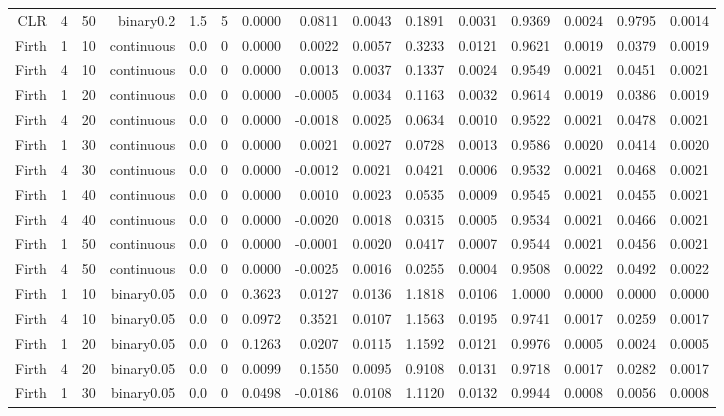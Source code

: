 \begin{longtable}{rrrrrrrrrrrrrrr}
  CLR & 4 & 50 & binary0.2 & 1.5 & 5 & 0.0000 & 0.0811 & 0.0043 & 0.1891 & 0.0031 & 0.9369 & 0.0024 & 0.9795 & 0.0014 \\ 
  Firth & 1 & 10 & continuous & 0.0 & 0 & 0.0000 & 0.0022 & 0.0057 & 0.3233 & 0.0121 & 0.9621 & 0.0019 & 0.0379 & 0.0019 \\ 
  Firth & 4 & 10 & continuous & 0.0 & 0 & 0.0000 & 0.0013 & 0.0037 & 0.1337 & 0.0024 & 0.9549 & 0.0021 & 0.0451 & 0.0021 \\ 
  Firth & 1 & 20 & continuous & 0.0 & 0 & 0.0000 & -0.0005 & 0.0034 & 0.1163 & 0.0032 & 0.9614 & 0.0019 & 0.0386 & 0.0019 \\ 
  Firth & 4 & 20 & continuous & 0.0 & 0 & 0.0000 & -0.0018 & 0.0025 & 0.0634 & 0.0010 & 0.9522 & 0.0021 & 0.0478 & 0.0021 \\ 
  Firth & 1 & 30 & continuous & 0.0 & 0 & 0.0000 & 0.0021 & 0.0027 & 0.0728 & 0.0013 & 0.9586 & 0.0020 & 0.0414 & 0.0020 \\ 
  Firth & 4 & 30 & continuous & 0.0 & 0 & 0.0000 & -0.0012 & 0.0021 & 0.0421 & 0.0006 & 0.9532 & 0.0021 & 0.0468 & 0.0021 \\ 
  Firth & 1 & 40 & continuous & 0.0 & 0 & 0.0000 & 0.0010 & 0.0023 & 0.0535 & 0.0009 & 0.9545 & 0.0021 & 0.0455 & 0.0021 \\ 
  Firth & 4 & 40 & continuous & 0.0 & 0 & 0.0000 & -0.0020 & 0.0018 & 0.0315 & 0.0005 & 0.9534 & 0.0021 & 0.0466 & 0.0021 \\ 
  Firth & 1 & 50 & continuous & 0.0 & 0 & 0.0000 & -0.0001 & 0.0020 & 0.0417 & 0.0007 & 0.9544 & 0.0021 & 0.0456 & 0.0021 \\ 
  Firth & 4 & 50 & continuous & 0.0 & 0 & 0.0000 & -0.0025 & 0.0016 & 0.0255 & 0.0004 & 0.9508 & 0.0022 & 0.0492 & 0.0022 \\ 
  Firth & 1 & 10 & binary0.05 & 0.0 & 0 & 0.3623 & 0.0127 & 0.0136 & 1.1818 & 0.0106 & 1.0000 & 0.0000 & 0.0000 & 0.0000 \\ 
  Firth & 4 & 10 & binary0.05 & 0.0 & 0 & 0.0972 & 0.3521 & 0.0107 & 1.1563 & 0.0195 & 0.9741 & 0.0017 & 0.0259 & 0.0017 \\ 
  Firth & 1 & 20 & binary0.05 & 0.0 & 0 & 0.1263 & 0.0207 & 0.0115 & 1.1592 & 0.0121 & 0.9976 & 0.0005 & 0.0024 & 0.0005 \\ 
  Firth & 4 & 20 & binary0.05 & 0.0 & 0 & 0.0099 & 0.1550 & 0.0095 & 0.9108 & 0.0131 & 0.9718 & 0.0017 & 0.0282 & 0.0017 \\ 
  Firth & 1 & 30 & binary0.05 & 0.0 & 0 & 0.0498 & -0.0186 & 0.0108 & 1.1120 & 0.0132 & 0.9944 & 0.0008 & 0.0056 & 0.0008 \\ 

\end{longtable}
